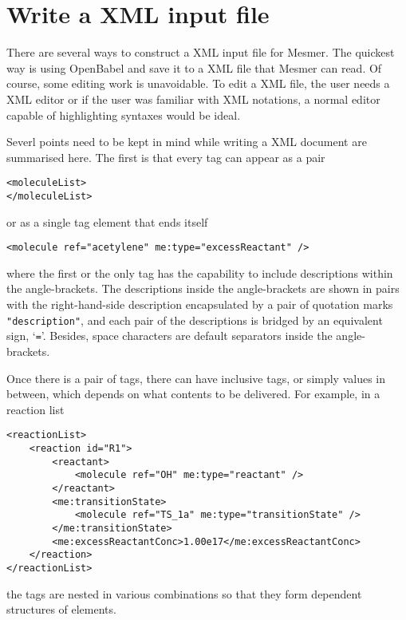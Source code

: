 \section{Write a XML input file}\label{sec:InputFile}

There are several ways to construct a XML input file for Mesmer. The quickest way is using OpenBabel and save it to a XML file that Mesmer can read. Of course, some editing work is unavoidable. To edit a XML file, the user needs a XML editor or if the user was familiar with XML notations, a normal editor capable of highlighting syntaxes would be ideal.

Severl points need to be kept in mind while writing a XML document are summarised here. The first is that every tag can appear as a pair

\begin{verbatim}
<moleculeList>
</moleculeList>
\end{verbatim}

or as a single tag element that ends itself

\begin{verbatim}
<molecule ref="acetylene" me:type="excessReactant" />
\end{verbatim}

where the first or the only tag has the capability to include descriptions within the angle-brackets. The descriptions inside the angle-brackets are shown in pairs with the right-hand-side description encapsulated by a pair of quotation marks \verb|"description"|, and each pair of the descriptions is bridged by an equivalent sign, `\verb|=|'. Besides, space characters are default separators inside the angle-brackets.

Once there is a pair of tags, there can have inclusive tags, or simply values in between, which depends on what contents to be delivered. For example, in a reaction list

{\footnotesize
\begin{verbatim}
<reactionList>
    <reaction id="R1">
        <reactant>
            <molecule ref="OH" me:type="reactant" />
        </reactant>
        <me:transitionState>
            <molecule ref="TS_1a" me:type="transitionState" />
        </me:transitionState>
        <me:excessReactantConc>1.00e17</me:excessReactantConc>
    </reaction>
</reactionList>
\end{verbatim}
}

the tags are nested in various combinations so that they form dependent structures of elements. 

